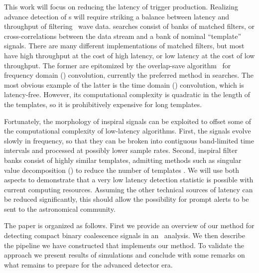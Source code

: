 This work will focus on reducing the latency of trigger production.  Realizing
advance detection of \CBC{}s will require striking a balance between latency
and throughput of filtering \GW\ wave data. \CBC{} searches consist of banks of
matched filters, or cross-correlations between the data stream and a bank of
nominal ``template'' signals.  There are many different implementations of
matched filters, but most have high throughput at the cost of high latency, or
low latency at the cost of low throughput.  The former are epitomized by the
overlap-save algorithm~%
for frequency domain (\FD) convolution, currently the preferred method in \GW{}
searches.  The most obvious example of the latter is the time domain (\TD)
convolution, which is latency-free.  However, its computational complexity is
quadratic in the length of the templates, so it is prohibitively expensive for
long templates.

Fortunately, the morphology of inspiral signals can be exploited to offset some
of the computational complexity of low-latency algorithms.  First, the signals
evolve slowly in frequency, so that they can be broken into contiguous
band-limited time intervals and processed at possibly lower sample rates.
Second, inspiral filter banks consist of highly similar templates, admitting
methods such as singular value decomposition (\SVD{}) to reduce the number of
templates \citep{Cannon:2010p10398}. We will use both aspects to demonstrate
that a very low latency detection statistic is possible with current computing
resources.  Assuming the other technical sources of latency can be reduced
significantly, this should allow the possibility for prompt alerts to be sent
to the astronomical community.

The paper is organized as follows. First we provide an overview of our method
for detecting compact binary coalescence signals in an \earlywarning\ analysis.
We then describe the pipeline we have constructed that implements our method.
To validate the approach we present results of simulations and conclude with
some remarks on what remains to prepare for the advanced detector era.

